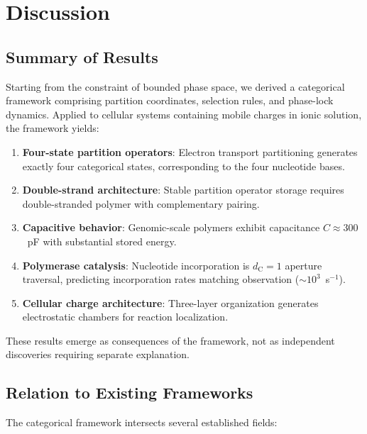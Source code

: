 \documentclass[twocolumn,aps,prb,superscriptaddress,longbibliography,floatfix]{revtex4-2}
\theoremstyle{remark}
\newcommand{\dC}{d_\text{C}}
\begin{document}
\section{Discussion}
\label{sec:discussion}

\subsection{Summary of Results}

Starting from the constraint of bounded phase space, we derived a
categorical framework comprising partition coordinates, selection rules,
and phase-lock dynamics. Applied to cellular systems containing mobile
charges in ionic solution, the framework yields:

\begin{enumerate}
    \item \textbf{Four-state partition operators}: Electron transport
    partitioning generates exactly four categorical states, corresponding
    to the four nucleotide bases.

    \item \textbf{Double-strand architecture}: Stable partition operator
    storage requires double-stranded polymer with complementary pairing.

    \item \textbf{Capacitive behavior}: Genomic-scale polymers exhibit
    capacitance $C \approx 300$~pF with substantial stored energy.

    \item \textbf{Polymerase catalysis}: Nucleotide incorporation is
    $\dC = 1$ aperture traversal, predicting incorporation rates matching
    observation ($\sim 10^3$~s$^{-1}$).

    \item \textbf{Cellular charge architecture}: Three-layer organization
    generates electrostatic chambers for reaction localization.
\end{enumerate}

These results emerge as consequences of the framework, not as
independent discoveries requiring separate explanation.

\subsection{Relation to Existing Frameworks}

The categorical framework intersects several established fields:
\end{document}
